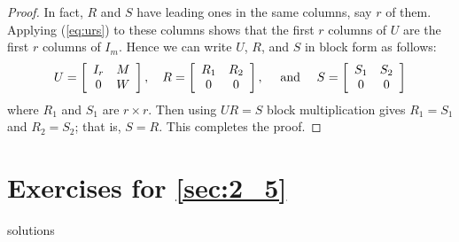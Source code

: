 \begin{proof}
In fact, $R$ and $S$ have leading ones in the same columns, say $r$ of them. Applying (\ref{eq:urs}) to these columns shows that the first $r$ columns of $U$ are the first $r$ columns of $I_{m}$. Hence we can write $U$, $R$, and $S$ in block form as follows:
\begin{equation*}
U = \left[ \begin{array}{cc}
I_{r} & M \\
0 & W
\end{array} \right], \quad
R = \left[ \begin{array}{cc}
R_{1} & R_{2} \\
0 & 0
\end{array} \right], \quad \mbox{ and } \quad
S = \left[ \begin{array}{cc}
S_{1} & S_{2} \\
0 & 0
\end{array} \right]
\end{equation*}
where $R_{1}$ and $S_{1}$ are $r \times r$. Then using $UR=S$ block multiplication gives $R_{1} = S_{1}$ and $R_{2} = S_{2}$; that is, $S = R$. This completes the proof.
\end{proof}

\section*{Exercises for \ref{sec:2_5}}

\begin{Filesave}{solutions}
\end{Filesave}

